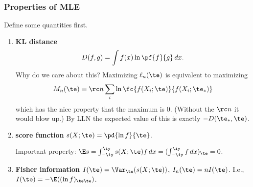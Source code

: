 %

\subsubsection{Properties of MLE}
Define some quantities first.
\begin{df}
\begin{enumerate}
\item
\textbf{KL distance}
\[
D(f,g)=\int f(x)\ln \pf{f}{g}\,dx.
\]
Why do we care about this? Maximizing $\ell_n(\te)$ is equivalent to maximizing 
\[
M_n(\te)=\rc n\sum_i\ln \fc{f(X_i;\te)}{f(X_i;\te_*)}
\]
which has the nice property that the maximum is 0. (Without the $\rc n$ it would blow up.) By LLN the expected value of this is exactly $-D(\te_*,\te)$.
\item 
\textbf{score function} $s(X;\te)=\pd{\ln f}{\te}$.

Important property: $\E s=\int_{-\iy}^{\iy} s(X;\te) f\,dx=(\int_{-\iy}^{\iy}f\,dx)_{\te}=0$. 
\item
\textbf{Fisher information} $I(\te)=\Var_\te(s(X;\te))$, $I_n(\te)=nI(\te)$.
I.e., $I(\te)=-\E((\ln f)_{\te\te})$.
\end{enumerate}
\end{df}


